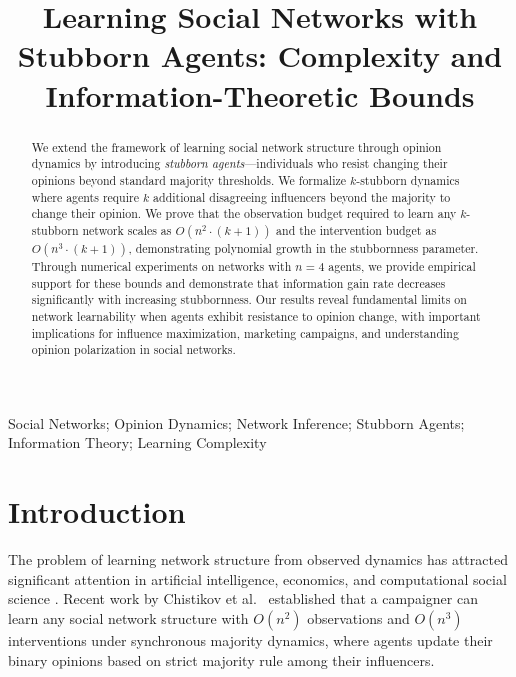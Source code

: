 \documentclass[conference]{IEEEtran}
\begin{document}
\title{Learning Social Networks with Stubborn Agents: Complexity and Information-Theoretic Bounds}

\author{
}

\maketitle

\begin{abstract}
We extend the framework of learning social network structure through opinion dynamics by introducing \emph{stubborn agents}---individuals who resist changing their opinions beyond standard majority thresholds. We formalize $k$-stubborn dynamics where agents require $k$ additional disagreeing influencers beyond the majority to change their opinion. We prove that the observation budget required to learn any $k$-stubborn network scales as $O(n^2 \cdot (k+1))$ and the intervention budget as $O(n^3 \cdot (k+1))$, demonstrating polynomial growth in the stubbornness parameter. Through numerical experiments on networks with $n=4$ agents, we provide empirical support for these bounds and demonstrate that information gain rate decreases significantly with increasing stubbornness. Our results reveal fundamental limits on network learnability when agents exhibit resistance to opinion change, with important implications for influence maximization, marketing campaigns, and understanding opinion polarization in social networks.
\end{abstract}

\begin{IEEEkeywords}
Social Networks; Opinion Dynamics; Network Inference; Stubborn Agents; Information Theory; Learning Complexity
\end{IEEEkeywords}

\section{Introduction}
\label{sec:introduction}

The problem of learning network structure from observed dynamics has attracted significant attention in artificial intelligence, economics, and computational social science \cite{easley2010networks,kempe2003maximizing}. Recent work by Chistikov et al.~\cite{chistikov2020convergence} established that a campaigner can learn any social network structure with $O(n^2)$ observations and $O(n^3)$ interventions under synchronous majority dynamics, where agents update their binary opinions based on strict majority rule among their influencers.
\end{document}
